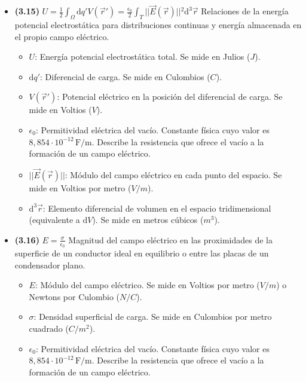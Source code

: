 \documentclass{article}
\begin{document}
\begin{itemize}
				\item \textbf{(3.15)} $\boxed{U = \frac{1}{2} \int_\Omega \mathrm{d}q' V(\vec{r}') = \frac{\epsilon_0}{2} \int_T \vert{}\vert{}\vec{E}(\vec{r})\vert{}\vert{}^2 \mathrm{d}^3\vec{r}}$ Relaciones de la energía potencial electrostática para distribuciones continuas y energía almacenada en el propio campo eléctrico.
					\begin{itemize}
						\item $U$: Energía potencial electrostática total. Se mide en Julios ($J$).
						\item $\mathrm{d}q'$: Diferencial de carga. Se mide en Culombios ($C$).
						\item $V(\vec{r}')$: Potencial eléctrico en la posición del diferencial de carga. Se mide en Voltios ($V$).
						\item $\epsilon_{0}$: Permitividad eléctrica del vacío. Constante física cuyo valor es $8,854\cdot10^{-12}\,\text{F/m}$. Describe la resistencia que ofrece el vacío a la formación de un campo eléctrico.
						\item $\vert{}\vert{}\vec{E}(\vec{r})\vert{}\vert{}$: Módulo del campo eléctrico en cada punto del espacio. Se mide en Voltios por metro ($V/m$).
						\item $\mathrm{d}^3\vec{r}$: Elemento diferencial de volumen en el espacio tridimensional (equivalente a $\mathrm{d}V$). Se mide en metros cúbicos ($m^3$).
					\end{itemize}

				\item \textbf{(3.16)} $\boxed{E = \frac{\sigma}{\epsilon_0}}$ Magnitud del campo eléctrico en las proximidades de la superficie de un conductor ideal en equilibrio o entre las placas de un condensador plano.
					\begin{itemize}
						\item $E$: Módulo del campo eléctrico. Se mide en Voltios por metro ($V/m$) o Newtons por Culombio ($N/C$).
						\item $\sigma$: Densidad superficial de carga. Se mide en Culombios por metro cuadrado ($C/m^2$).
						\item $\epsilon_{0}$: Permitividad eléctrica del vacío. Constante física cuyo valor es $8,854\cdot10^{-12}\,\text{F/m}$. Describe la resistencia que ofrece el vacío a la formación de un campo eléctrico.
					\end{itemize}


\end{itemize}
\end{document}
